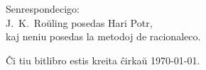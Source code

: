 \newpage
\vspace*{4cm}
\begin{center}
Senrespondecigo:\\J.~K.~Roŭling posedas Hari Potr,\\kaj neniu posedas la metodoj de racionaleco.
\end{center}

\vfill
Ĉi tiu bitlibro estis kreita ĉirkaŭ \today{}.
